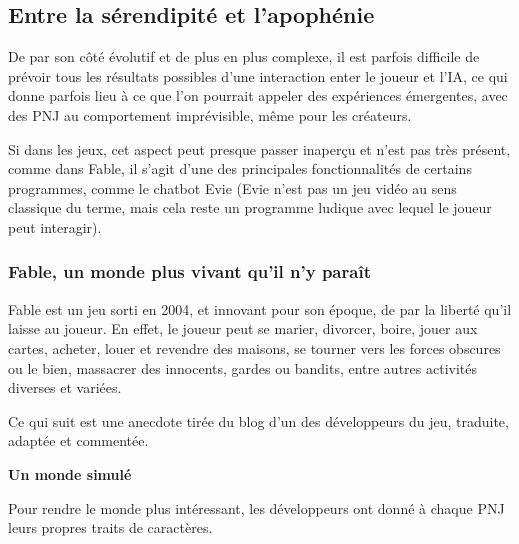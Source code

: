 \documentclass[a4paper, 12pt]{article} %
\begin{document}
\newpage
\subsection{Entre la sérendipité et l'apophénie}

De par son côté évolutif et de plus en plus complexe, il est parfois difficile de prévoir tous les résultats possibles d’une interaction enter le joueur et l’IA, ce qui donne parfois lieu à ce que l'on pourrait appeler des expériences émergentes, avec des PNJ au comportement imprévisible, même pour les créateurs.

Si dans les jeux, cet aspect peut presque passer inaperçu et n'est pas très présent, comme dans Fable, il s'agit d'une des principales fonctionnalités de certains programmes, comme le chatbot Evie (Evie n'est pas un jeu vidéo au sens classique du terme, mais cela reste un programme ludique avec lequel le joueur peut interagir).

\newpage
\subsubsection{Fable, un monde plus vivant qu'il n'y paraît}

Fable est un jeu sorti en 2004, et innovant pour son époque, de par la liberté qu’il laisse au joueur. En effet, le joueur peut se marier, divorcer, boire, jouer aux cartes, acheter, louer et revendre des maisons, se tourner vers les forces obscures ou le bien, massacrer des innocents, gardes ou bandits, entre autres activités diverses et variées.

Ce qui suit est une anecdote tirée du blog d’un des développeurs du jeu\cite{fable}, traduite, adaptée et commentée.

%
	
\textbf{Un monde simulé}

Pour rendre le monde plus intéressant, les développeurs ont donné à chaque PNJ leurs propres traits de caractères.
\end{document}
